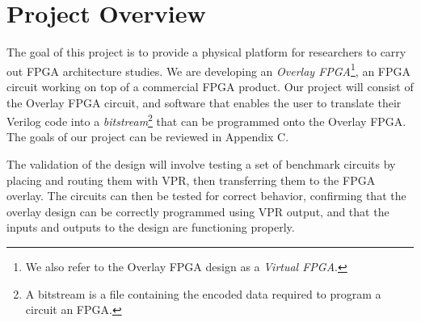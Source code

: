 \section{Project Overview}


The goal of this project is to provide a physical platform for researchers to carry out FPGA architecture studies.
We are developing an \emph{Overlay FPGA}\footnote{We also refer to the Overlay FPGA design as a \emph{Virtual FPGA}.}, an FPGA circuit working on top of a commercial FPGA product.
Our project will consist of the Overlay FPGA circuit, and software that enables the user to translate their Verilog code into a \emph{bitstream}\footnote{A bitstream is a file containing the encoded data required to program a circuit an FPGA.} that can be programmed onto the Overlay FPGA.
The goals of our project can be reviewed in Appendix C.



The validation of the design will involve testing a set of benchmark circuits by placing and
routing them with VPR, then transferring them to the FPGA overlay. The circuits can
then be tested for correct behavior, confirming that the overlay design can be correctly programmed using VPR output, and that the inputs and outputs to the design are functioning
properly.


